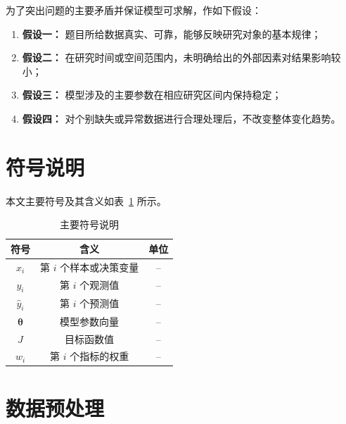 \documentclass[UTF8,fontset=none,a4paper,12pt]{ctexart}
\begin{document}
为了突出问题的主要矛盾并保证模型可求解，作如下假设：

\begin{enumerate}
  \item \textbf{假设一：} 题目所给数据真实、可靠，能够反映研究对象的基本规律；
  \item \textbf{假设二：} 在研究时间或空间范围内，未明确给出的外部因素对结果影响较小；
  \item \textbf{假设三：} 模型涉及的主要参数在相应研究区间内保持稳定；
  \item \textbf{假设四：} 对个别缺失或异常数据进行合理处理后，不改变整体变化趋势。
\end{enumerate}


\section{符号说明}

本文主要符号及其含义如表~\ref{tab:symbols} 所示。

\begin{table}[H]
  \centering
  \caption{主要符号说明}
  \label{tab:symbols}
  \begin{tabular}{ccc}
    \toprule
    符号 & 含义 & 单位 \\
    \midrule
    $x_i$ & 第 $i$ 个样本或决策变量 & -- \\
    $y_i$ & 第 $i$ 个观测值 & -- \\
    $\hat y_i$ & 第 $i$ 个预测值 & -- \\
    $\bm{\theta}$ & 模型参数向量 & -- \\
    $J$ & 目标函数值 & -- \\
    $w_i$ & 第 $i$ 个指标的权重 & -- \\
    \bottomrule
  \end{tabular}
\end{table}


\section{数据预处理}
\end{document}
